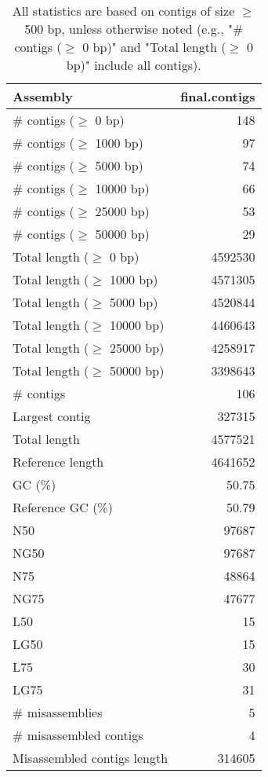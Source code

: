 \documentclass[12pt,a4paper]{article}
\begin{document}
\begin{table}[ht]
\begin{center}
\caption{All statistics are based on contigs of size $\geq$ 500 bp, unless otherwise noted (e.g., "\# contigs ($\geq$ 0 bp)" and "Total length ($\geq$ 0 bp)" include all contigs).}
\begin{tabular}{|l*{1}{|r}|}
\hline
Assembly & final.contigs \\ \hline
\# contigs ($\geq$ 0 bp) & 148 \\ \hline
\# contigs ($\geq$ 1000 bp) & 97 \\ \hline
\# contigs ($\geq$ 5000 bp) & 74 \\ \hline
\# contigs ($\geq$ 10000 bp) & 66 \\ \hline
\# contigs ($\geq$ 25000 bp) & 53 \\ \hline
\# contigs ($\geq$ 50000 bp) & 29 \\ \hline
Total length ($\geq$ 0 bp) & 4592530 \\ \hline
Total length ($\geq$ 1000 bp) & 4571305 \\ \hline
Total length ($\geq$ 5000 bp) & 4520844 \\ \hline
Total length ($\geq$ 10000 bp) & 4460643 \\ \hline
Total length ($\geq$ 25000 bp) & 4258917 \\ \hline
Total length ($\geq$ 50000 bp) & 3398643 \\ \hline
\# contigs & 106 \\ \hline
Largest contig & 327315 \\ \hline
Total length & 4577521 \\ \hline
Reference length & 4641652 \\ \hline
GC (\%) & 50.75 \\ \hline
Reference GC (\%) & 50.79 \\ \hline
N50 & 97687 \\ \hline
NG50 & 97687 \\ \hline
N75 & 48864 \\ \hline
NG75 & 47677 \\ \hline
L50 & 15 \\ \hline
LG50 & 15 \\ \hline
L75 & 30 \\ \hline
LG75 & 31 \\ \hline
\# misassemblies & 5 \\ \hline
\# misassembled contigs & 4 \\ \hline
Misassembled contigs length & 314605 \\ \hline

\end{tabular}
\end{center}
\end{table}
\end{document}
